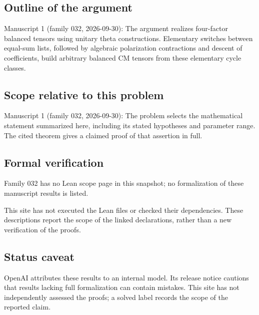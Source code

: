 \documentclass[11pt]{article}
\begin{document}
\subsection{Outline of the argument}
Manuscript 1 (family 032, 2026-09-30): The argument realizes four-factor balanced tensors using unitary theta constructions. Elementary switches between equal-sum lists, followed by algebraic polarization contractions and descent of coefficients, build arbitrary balanced CM tensors from these elementary cycle classes.

\subsection{Scope relative to this problem}
Manuscript 1 (family 032, 2026-09-30): The problem selects the mathematical statement summarized here, including its stated hypotheses and parameter range. The cited theorem gives a claimed proof of that assertion in full.

\subsection{Formal verification}
Family 032 has no Lean scope page in this snapshot; no formalization of these manuscript results is listed.

This site has not executed the Lean files or checked their dependencies. These descriptions report the scope of the linked declarations, rather than a new verification of the proofs.

\subsection{Status caveat}
OpenAI attributes these results to an internal model. Its release notice cautions that results lacking full formalization can contain mistakes. This site has not independently assessed the proofs; a solved label records the scope of the reported claim.
\end{document}
